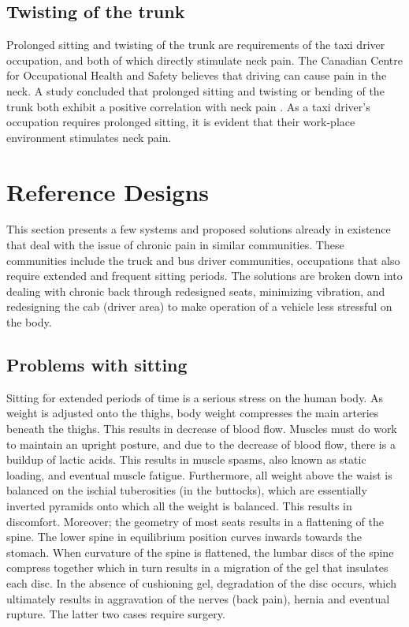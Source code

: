 \documentclass[11pt]{article}
\begin{document}
\subsection{Twisting of the trunk}
Prolonged sitting and twisting of the trunk are requirements of the
taxi driver occupation, and both of which directly stimulate neck
pain. The Canadian Centre for Occupational Health and Safety believes
that driving can cause pain in the neck\cite{proof}. A study concluded
that prolonged sitting and twisting or bending of the trunk both
exhibit a positive correlation with neck pain \cite{neck}. As a taxi
driver’s occupation requires prolonged sitting, it is evident that
their work-place environment stimulates neck pain.
\section{Reference Designs}
\label{sec:designs}

This section presents a few systems and proposed solutions already in existence that deal with the issue of
chronic pain in similar communities. These communities include the truck and bus driver communities, occupations 
that also require extended and frequent sitting periods. The solutions are broken down into dealing with chronic back 
through redesigned seats, minimizing vibration, and redesigning the cab (driver area) to make operation of a vehicle
less stressful on the body.

\subsection{Problems with sitting}
\label{sec:sittingproblems}

Sitting for extended periods of time is a serious stress on the human body. As weight is adjusted
onto the thighs, body weight compresses the main arteries beneath the thighs. This results in 
decrease of blood flow. Muscles must do work to maintain an upright posture, and due to the decrease 
of blood flow, there is a buildup of lactic acids. This results in muscle spasms, also known as static
loading, and eventual muscle fatigue. Furthermore, all weight above the waist is balanced on the ischial 
tuberosities (in the buttocks), which are essentially inverted pyramids onto which all the weight is 
balanced. This results in discomfort. Moreover; the geometry of most seats results in a flattening of the 
spine. The lower spine in equilibrium position curves inwards towards the stomach. When curvature of the 
spine is flattened, the lumbar discs of the spine compress together which in turn results in a migration of 
the gel that insulates each disc. In the absence of cushioning gel, degradation of the disc occurs, which 
ultimately results in aggravation of the nerves (back pain), hernia and eventual rupture. The latter two cases
require surgery\cite{ergoCentricAnatomy2011}.
\end{document}

